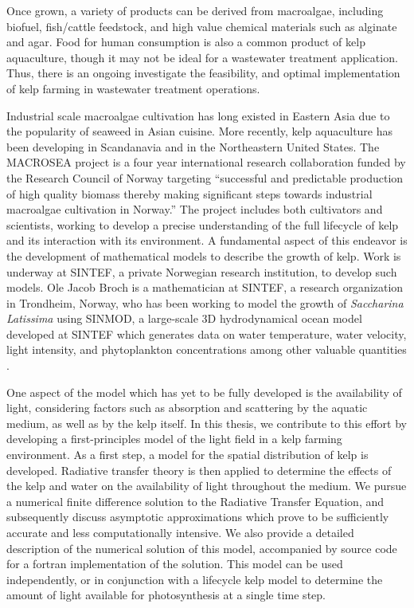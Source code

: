 Once grown, a variety of products can be derived from macroalgae, including biofuel, fish/cattle feedstock, and high value chemical materials such as alginate and agar.
Food for human consumption is also a common product of kelp aquaculture, though it may not be ideal for a wastewater treatment application.
Thus, there is an ongoing investigate the feasibility, and optimal implementation of kelp farming in wastewater treatment operations. 

Industrial scale macroalgae cultivation has long existed in Eastern Asia due to the popularity of seaweed in Asian cuisine.
  More recently, kelp aquaculture has been developing in Scandanavia and in the Northeastern United States.
The MACROSEA project is a four year international research collaboration funded by the Research Council of Norway targeting ``successful and predictable production of high quality biomass thereby making significant steps towards industrial macroalgae cultivation in Norway.'' %
The project includes both cultivators and scientists, working to develop a precise understanding of the full lifecycle of kelp and its interaction with its environment.
A fundamental aspect of this endeavor is the development of mathematical models to describe the growth of kelp.
Work is underway at SINTEF, a private Norwegian research institution, to develop such models.
Ole Jacob Broch is a mathematician at SINTEF, a research organization in Trondheim, Norway, who has been working to model the growth of \textit{Saccharina Latissima} using SINMOD, a large-scale 3D hydrodynamical ocean model developed at SINTEF which generates data on water temperature, water velocity, light intensity, and phytoplankton concentrations among other valuable quantities \cite{wassmann_modelling_2006}.

One aspect of the model which has yet to be fully developed is the availability of light, considering factors such as absorption and scattering by the aquatic medium, as well as by the kelp itself.
In this thesis, we contribute to this effort by developing a first-principles model of the light field in a kelp farming environment.
As a first step, a model for the spatial distribution of kelp is developed.
Radiative transfer theory is then applied to determine the effects of the kelp and water on the availability of light throughout the medium.
We pursue a numerical finite difference solution to the Radiative Transfer Equation, and subsequently discuss asymptotic approximations which prove to be sufficiently accurate and less computationally intensive.
We also provide a detailed description of the numerical solution of this model, accompanied by source code for a fortran implementation of the solution.
This model can be used independently, or in conjunction with a lifecycle kelp model to determine the amount of light available for photosynthesis at a single time step.

